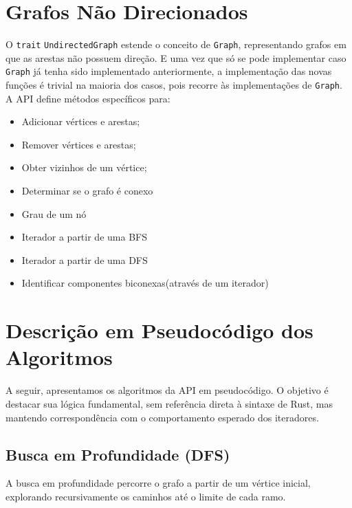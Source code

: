 \section{Grafos Não Direcionados}

O \texttt{trait} \texttt{UndirectedGraph} estende o conceito de \texttt{Graph}, representando grafos em que as arestas não possuem direção. E uma vez que só se pode implementar caso \texttt{Graph} já tenha sido implementado anteriormente, a implementação das novas funções é trivial na maioria dos casos, pois recorre às implementações de \texttt{Graph}. A API define métodos específicos para:

\begin{itemize}
    \item Adicionar vértices e arestas;
    \item Remover vértices e arestas;
    \item Obter vizinhos de um vértice;
    \item Determinar se o grafo é conexo
    \item Grau de um nó
    \item Iterador a partir de uma BFS
    \item Iterador a partir de uma DFS
    \item Identificar componentes biconexas(através de um iterador)
\end{itemize}

\section{Descrição em Pseudocódigo dos Algoritmos}

A seguir, apresentamos os algoritmos da API em pseudocódigo. O objetivo é destacar sua lógica fundamental, sem referência direta à sintaxe de Rust, mas mantendo correspondência com o comportamento esperado dos iteradores.

\subsection{Busca em Profundidade (DFS)}

A busca em profundidade percorre o grafo a partir de um vértice inicial, explorando recursivamente os caminhos até o limite de cada ramo. 

